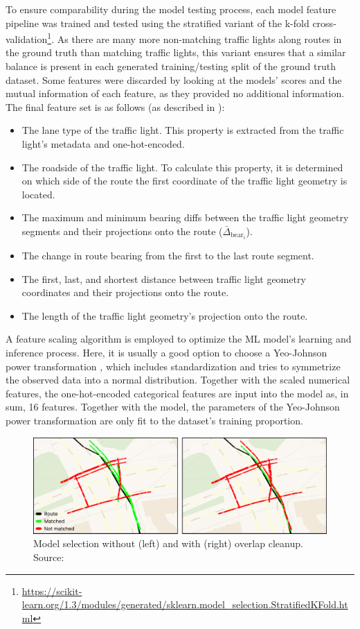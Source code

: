 To ensure comparability during the model testing process, each model feature pipeline was trained and tested using the stratified variant of the k-fold cross-validation\footnote{\url{https://scikit-learn.org/1.3/modules/generated/sklearn.model_selection.StratifiedKFold.html}}. As there are many more non-matching traffic lights along routes in the ground truth than matching traffic lights, this variant ensures that a similar balance is present in each generated training/testing split of the ground truth dataset. Some features were discarded by looking at the models' scores and the mutual information of each feature, as they provided no additional information. The final feature set is as follows (as described in \cite{matthes2023geo}):

\begin{itemize}
    \item The lane type of the traffic light. This property is extracted from the traffic light's metadata and one-hot-encoded.
    \item The roadside of the traffic light. To calculate this property, it is determined on which side of the route the first coordinate of the traffic light geometry is located.
    \item The maximum and minimum bearing diffs between the traffic light geometry segments and their projections onto the route ($\bar{\Delta}_{\text{bear}_i}$).
    \item The change in route bearing from the first to the last route segment. 
    \item The first, last, and shortest distance between traffic light geometry coordinates and their projections onto the route.
    \item The length of the traffic light geometry's projection onto the route.
\end{itemize}

A feature scaling algorithm is employed to optimize the ML model's learning and inference process. Here, it is usually a good option to choose a Yeo-Johnson power transformation \cite{yeo_new_2000}, which includes standardization and tries to symmetrize the observed data into a normal distribution. Together with the scaled numerical features, the one-hot-encoded categorical features are input into the model as, in sum, 16 features. Together with the model, the parameters of the Yeo-Johnson power transformation are only fit to the dataset's training proportion.

\begin{figure}[t]
\centering
\includegraphics[width=\linewidth]{images/sg-selection-overlap-cleanup.pdf}
\caption{Model selection without (left) and with (right) overlap cleanup. Source: \cite{matthes2023geo}}
\label{fig:sg-selection-overlap-cleanup}
\end{figure}

